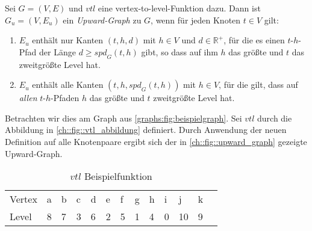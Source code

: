 \begin{definition}\label{people:def:upward_graph}
  Sei $G = (V, E)$ und ${vtl}$ eine vertex-to-level-Funktion dazu.
  Dann ist $G_u = (V, E_u)$ ein \emph{Upward-Graph} zu $G$, wenn für jeden Knoten $t \in V$ gilt:

  \begin{enumerate}
    \item
          $E_u$ enthält nur Kanten $(t, h, d)$ mit $h \in V$ und $d \in \mathbb{R}^+$, für die es einen $t$-$h$-Pfad der Länge $d \geq {spd}_G (t, h)$ gibt, so dass auf ihm $h$ das größte und $t$ das zweitgrößte Level hat.

    \item
          $E_u$ enthält alle Kanten $(t, h, {spd}_G (t, h))$ mit $h \in V$, für die gilt, dass auf \emph{allen} $t$-$h$-Pfaden $h$ das größte und $t$ zweitgrößte Level hat.
  \end{enumerate}
\end{definition}

Betrachten wir dies am Graph aus \autoref{graphs:fig:beispielgraph}.
Sei ${vtl}$ durch die Abbildung in \autoref{ch::fig::vtl_abbildung} definiert.
Durch Anwendung der neuen Definition auf alle Knotenpaare ergibt sich der in \autoref{ch::fig::upward_graph} gezeigte Upward-Graph.

\begin{table}[ht]
  \centering
  \begin{tabular}{lllllllllllll}
    Vertex & a & b & c & d & e & f & g & h & i & j  & k & \\
    Level  & 8 & 7 & 3 & 6 & 2 & 5 & 1 & 4 & 0 & 10 & 9 &
  \end{tabular}
  \caption{${vtl}$ Beispielfunktion}
  \label{ch::fig::vtl_abbildung}
\end{table}

